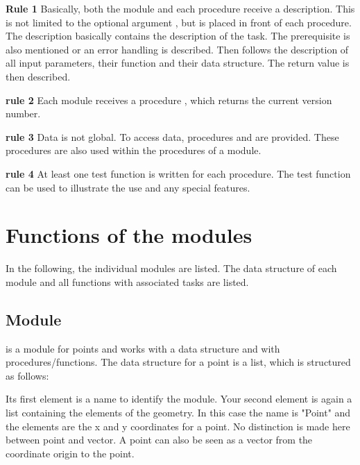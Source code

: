 \bigskip

\textbf{Rule 1} Basically, both the module and each procedure receive a description. This is not limited to the optional argument , but is placed in front of each procedure. The description basically contains the description of the task. The prerequisite is also mentioned or an error handling is described. Then follows the description of all input parameters, their function and their data structure. The return value is then described.

\bigskip

\textbf{rule 2} Each module receives a procedure , which returns the current version number.


\bigskip

\textbf{rule 3} Data is not global. To access data, procedures  and  are provided. These procedures are also used within the procedures of a module.

\bigskip

\textbf{rule 4} At least one test function is written for each procedure. The test function can be used to illustrate the use and any special features.

\section{Functions of the modules}

In the following, the individual modules are listed. The data structure of each module and all functions with associated tasks are listed.

\subsection{Module }

 is a module for points and works with a data structure and with procedures/functions. The data structure  for a point is a list, which is structured as follows:

\medskip

\MapleCommand{[MVPOINT, [x,y]]}

\medskip

Its first element is a name to identify the module. Your second element is again a list containing the elements of the geometry. In this case the name is "Point" and the elements are the x and y coordinates for a point. No distinction is made here between point and vector. A point can also be seen as a vector from the coordinate origin to the point. 

